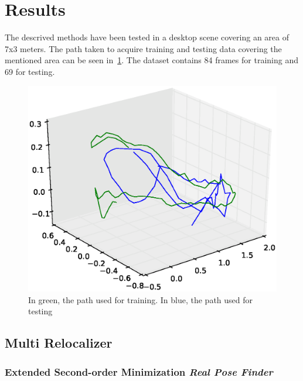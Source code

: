 

\section{Results}
\label{sec:results}

The descrived methods have been tested in a desktop scene covering an area of 7x3 meters. The path taken to acquire training and testing data covering the mentioned area can be seen in~\ref{fig:large_desktop_train_test}. The dataset contains 84 frames for training and 69 for testing.\\

\begin{figure}[htpb]
  \includegraphics[width=\linewidth]{img/large_desktop/test_train_path.eps}
  \caption{In green, the path used for training. In blue, the path used for testing}
  \label{fig:large_desktop_train_test}
\end{figure}

\subsection{Multi Relocalizer}
\label{sub:multi_relocalizer_large}


\subsubsection{Extended Second-order Minimization \textit{Real Pose Finder}}
\label{ssub:extended_second_orther_minimization_real_pose_finder}

